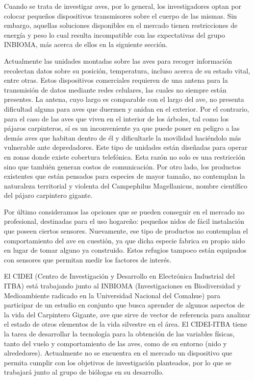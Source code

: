 %

%


Cuando se trata de investigar aves, por lo general, los investigadores optan por colocar pequeños dispositivos transmisores sobre el cuerpo de las mismas. Sin embargo, aquellas soluciones disponibles en el mercado tienen restricciones de energía y peso lo cual resulta incompatible con las expectativas del grupo INBIOMA, más acerca de ellos en la siguiente sección.

Actualmente las unidades montadas sobre las aves para recoger información recolectan datos sobre su posición, temperatura, incluso acerca de su estado vital, entre otras. Estos dispositivos comerciales requieren de una antena para la transmisión de datos mediante redes celulares, las cuales no siempre están presentes. La antena, cuyo largo es comparable con el largo del ave, no presenta dificultad alguna para aves que duermen y anidan en el exterior. Por el contrario, para el caso de las aves que viven en el interior de los árboles, tal como los pájaros carpinteros, sí es un inconveniente ya que puede poner en peligro a las demás aves que habitan dentro de él y dificultarle la movilidad haciéndolo más vulnerable ante depredadores. 
Este tipo de unidades están diseñadas para operar en zonas donde existe cobertura telefónica. Esta razón no solo es una restricción sino que también generan costos de comunicación. Por otro lado, los productos existentes que están pensados para especies de mayor tamaño, no contemplan la naturaleza territorial y violenta del Campephilus Magellanicus, nombre científico del pájaro carpintero gigante.

Por último consideramos las opciones que se pueden conseguir en el mercado no profesional, destinadas para el uso hogareño: pequeños nidos de fácil instalación que poseen ciertos sensores. Nuevamente, ese tipo de productos no contemplan el comportamiento del ave en cuestión, ya que dicha especie fabrica su propio nido en lugar de tomar alguno ya construido. Estos refugios tampoco están equipados con sensores que permitan medir los factores de interés. 

El CIDEI (Centro de Investigación y Desarrollo en Electrónica Industrial del ITBA) está trabajando junto al INBIOMA (Investigaciones en Biodiversidad y Medioambiente radicado en la Universidad Nacional del Comahue) para participar de un estudio en conjunto que busca aprender de algunos aspectos de la vida del Carpintero Gigante, ave que sirve de vector de referencia para analizar el estado de otros elementos de la vida silvestre en el área. El CIDEI-ITBA tiene la tarea de desarrollar la tecnología para la obtención de las variables físicas, tanto del vuelo y comportamiento de las aves, como de su entorno (nido y alrededores). Actualmente no se encuentra en el mercado un dispositivo que permita cumplir con los objetivos de investigación planteados, por lo que se trabajará junto al grupo de biólogas en su desarrollo.

